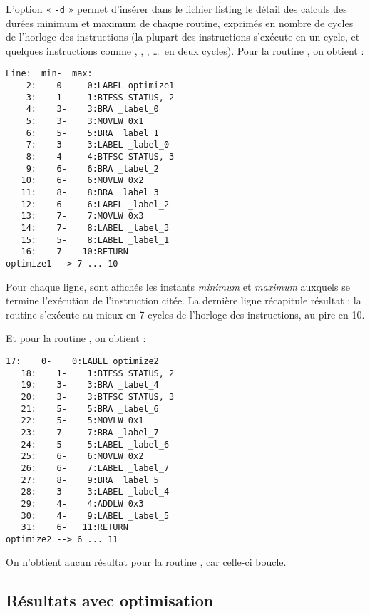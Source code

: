 L'option « \texttt{-d} » permet d'insérer dans le fichier listing le détail des calculs des durées minimum et maximum de chaque routine, exprimés en nombre de cycles de l'horloge des instructions (la plupart des instructions s'exécute en un cycle, et quelques instructions comme , , , \dots\ en deux cycles). Pour la routine , on obtient :

\begin{lstlisting}[language=assembleur, frame=l]
 Line:  min-  max:
    2:    0-    0:LABEL optimize1
    3:    1-    1:BTFSS STATUS, 2
    4:    3-    3:BRA _label_0
    5:    3-    3:MOVLW 0x1
    6:    5-    5:BRA _label_1
    7:    3-    3:LABEL _label_0
    8:    4-    4:BTFSC STATUS, 3
    9:    6-    6:BRA _label_2
   10:    6-    6:MOVLW 0x2
   11:    8-    8:BRA _label_3
   12:    6-    6:LABEL _label_2
   13:    7-    7:MOVLW 0x3
   14:    7-    8:LABEL _label_3
   15:    5-    8:LABEL _label_1
   16:    7-   10:RETURN
optimize1 --> 7 ... 10
\end{lstlisting}

Pour chaque ligne, sont affichés les instants \emph{minimum} et \emph{maximum} auxquels se termine l'exécution de l'instruction citée. La dernière ligne récapitule résultat : la routine  s'exécute au mieux en 7 cycles de l'horloge des instructions, au pire en 10.

Et pour la routine , on obtient :

\begin{lstlisting}[language=assembleur, frame=l]
   17:    0-    0:LABEL optimize2
   18:    1-    1:BTFSS STATUS, 2
   19:    3-    3:BRA _label_4
   20:    3-    3:BTFSC STATUS, 3
   21:    5-    5:BRA _label_6
   22:    5-    5:MOVLW 0x1
   23:    7-    7:BRA _label_7
   24:    5-    5:LABEL _label_6
   25:    6-    6:MOVLW 0x2
   26:    6-    7:LABEL _label_7
   27:    8-    9:BRA _label_5
   28:    3-    3:LABEL _label_4
   29:    4-    4:ADDLW 0x3
   30:    4-    9:LABEL _label_5
   31:    6-   11:RETURN
optimize2 --> 6 ... 11
\end{lstlisting}

On n'obtient aucun résultat pour la routine , car celle-ci boucle.

\subsection{Résultats avec optimisation}

